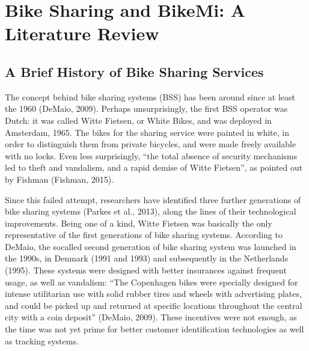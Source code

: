 \documentclass[letterpaper,10pt,english]{jupyterBook}
\begin{document}
\chapter{Bike Sharing and BikeMi: A Literature Review}
\label{\detokenize{02-bikesharing_and_bikemi:bike-sharing-and-bikemi-a-literature-review}}\label{\detokenize{02-bikesharing_and_bikemi::doc}}

\section{A Brief History of Bike Sharing Services}
\label{\detokenize{02-bikesharing_and_bikemi:a-brief-history-of-bike-sharing-services}}
\sphinxAtStartPar
The concept behind bike sharing systems (BSS) has been around since at least the 1960 (DeMaio, 2009). Perhaps unsurprisingly, the first BSS operator was Dutch: it was called Witte Fietsen, or White Bikes, and was deployed in Amsterdam, 1965. The bikes for the sharing service were painted in white, in order to distinguish them from private bicycles, and were made freely available with no locks. Even less surprisingly, “the total absence of security mechanisms led to theft and vandalism, and a rapid demise of Witte Fietsen”, as pointed out by Fishman (Fishman, 2015).

\sphinxAtStartPar
Since this failed attempt, researchers have identified three further generations of bike sharing systems (Parkes et al., 2013), along the lines of their technological improvements. Being one of a kind, Witte Fietsen was basically the only representative of the first generations of bike sharing systems. According to DeMaio, the so\sphinxhyphen{}called second generation of bike sharing system was launched in the 1990s, in Denmark (1991 and 1993) and subsequently in the Netherlands (1995). These systems were designed with better insurances against frequent usage, as well as vandalism: “The Copenhagen bikes were specially designed for intense utilitarian use with solid rubber tires and wheels with advertising plates, and could be picked up and returned at specific locations throughout the central city with a coin deposit” (DeMaio, 2009). These incentives were not enough, as the time was not yet prime for better customer identification technologies as well as tracking systems.
\end{document}
